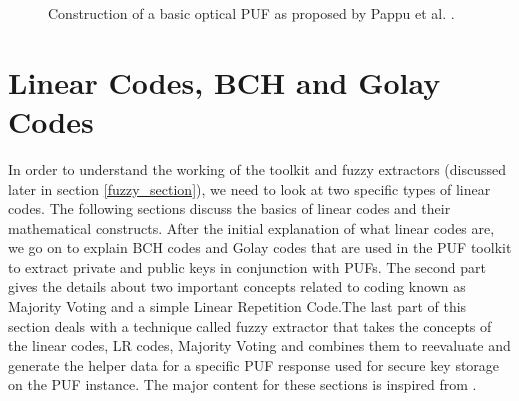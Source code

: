 \begin{figure}
\centering
{}
\caption{Construction of a basic optical PUF as proposed by Pappu et al. \cite{18,19}.}
\label{img:optical}
\end{figure}

\section{Linear Codes, BCH and Golay Codes}
In order to understand the working of the toolkit and fuzzy extractors (discussed later in section \ref{fuzzy_section}), we need to look at two specific types of linear codes. The following sections discuss the basics of linear codes and their mathematical constructs. After the initial explanation of what linear codes are, we go on to explain BCH codes and Golay codes that are used in the PUF toolkit to extract private and public keys in conjunction with PUFs. The second part
gives the details about two important concepts related to coding known as Majority Voting and a simple Linear Repetition Code.The last part of
this section deals with a technique called fuzzy extractor that takes the concepts of the linear codes, LR codes, Majority Voting and combines them to reevaluate and generate the helper data for a specific PUF response used for secure key storage on the PUF instance. The major
content for these sections is inspired from \cite{chap2}.\\

